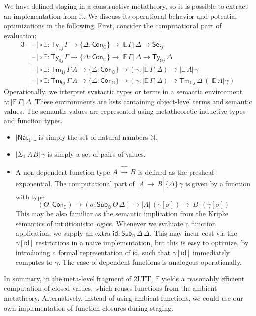 \documentclass[acmsmall]{acmart}
\newcommand{\msf}[1]{\mathsf{#1}}
\newcommand{\mbb}[1]{\mathbb{#1}}
\newcommand{\wh}[1]{\widehat{#1}}
\newcommand{\mbbo}{\mbb{O}}
\newcommand{\Ty}{\msf{Ty}}
\newcommand{\Tm}{\msf{Tm}}
\newcommand{\Cono}{\msf{Con}_{\mbbo}}
\newcommand{\Subo}{\msf{Sub}_{\mbbo}}
\newcommand{\Nat}{\msf{Nat}}
\newcommand{\id}{\msf{id}}
\newcommand{\Set}{\mathsf{Set}}
\newcommand{\blank}{{\mathord{\hspace{1pt}\text{--}\hspace{1pt}}}}
\newcommand{\ev}{\mbb{E}}
\theoremstyle{remark}
\begin{document}
We have defined staging in a constructive metatheory, so it is possible to
extract an implementation from it. We discuss its operational behavior and
potential optimizations in the following. First, consider the computational
part of evaluation:
\begin{alignat*}{3}
  & |\blank| \circ \ev : \Ty_{1 j}\,\Gamma \to \{\Delta : \Cono\} \to |\ev\,\Gamma|\,\Delta \to \Set_j\\
  & |\blank| \circ \ev : \Ty_{0 j}\,\Gamma \to \{\Delta : \Cono\} \to |\ev\,\Gamma|\,\Delta \to \Ty_{\mbbo j}\,\Delta\\
  & |\blank| \circ \ev : \Tm_{1 j}\,\Gamma\,A \to \{\Delta : \Cono\} \to (\gamma : |\ev\,\Gamma|\,\Delta) \to
    |\ev\,A|\,\gamma \\
  & |\blank| \circ \ev : \Tm_{0 j}\,\Gamma\,A \to \{\Delta : \Cono\} \to (\gamma : |\ev\,\Gamma|\,\Delta) \to
    \Tm_{\mbbo\,j}\,\Delta\,(|\ev\,A|\,\gamma)
\end{alignat*}
Operationally, we interpret syntactic types or terms in a semantic environment
$\gamma : |\ev\,\Gamma|\,\Delta$. These environments are lists containing
object-level terms and semantic values. The semantic values are represented
using metatheoretic inductive types and function types.
\begin{itemize}
  \item $|\Nat_1|\,\_$ is simply the set of natural numbers $\mbb{N}$.
  \item $|\Sigma_1\,A\,B|\,\gamma$ is simply a set of pairs of values.
  \item A non-dependent function type $A\,\wh{\to}\,B$ is defined as the presheaf
        exponential. The computational part of $|A\,\wh{\to}\,B|\,\{\Delta\}\,\gamma$
        is given by a function with type
        \[ (\Theta : \Cono) \to (\sigma : \Subo\,\Theta\,\Delta) \to |A|\,(\gamma[\sigma]) \to |B|\,(\gamma[\sigma])        \]
        This may be also familiar as the semantic implication from the Kripke
        semantics of intuitionistic logics. Whenever we evaluate a function
        application, we supply an extra $\id : \Subo\,\Delta\,\Delta$. This may
        incur cost via the $\gamma[\id]$ restrictions in a naive
        implementation, but this is easy to optimize, by introducing a formal
        representation of $\id$, such that $\gamma[\id]$ immediately computes to
        $\gamma$. The case of dependent functions is analogous operationally.
\end{itemize}
In summary, in the meta-level fragment of 2LTT, $\ev$ yields a reasonably efficient
computation of closed values, which reuses functions from the ambient
metatheory. Alternatively, instead of using ambient functions, we could use our
own implementation of function closures during staging.
\end{document}

